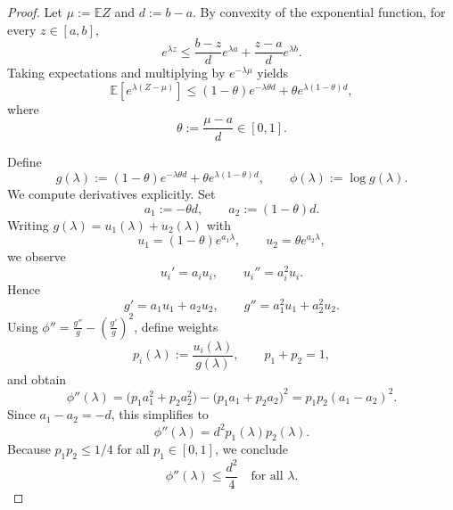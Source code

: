 \documentclass[12pt]{article}
\renewcommand{\(}{\left(}%
\renewcommand{\)}{\right)}%
\renewcommand{\[}{\left[}%
\renewcommand{\]}{\right]}%
\newtheorem{proof}{Proof.}}
\begin{document}
\begin{proof}
Let $\mu := \mathbb{E}Z$ and $d := b-a$. By convexity of the exponential function, for every $z \in [a,b]$,
\begin{equation*}
e^{\lambda z}
\le
\frac{b-z}{d} e^{\lambda a}
+
\frac{z-a}{d} e^{\lambda b}.
\end{equation*}
Taking expectations and multiplying by $e^{-\lambda\mu}$ yields
\begin{equation*}
\mathbb{E}\!\left[e^{\lambda(Z-\mu)}\right]
\le
(1-\theta)e^{-\lambda \theta d}
+
\theta e^{\lambda (1-\theta)d},
\end{equation*}
where
\begin{equation*}
\theta := \frac{\mu-a}{d} \in [0,1].
\end{equation*}

Define
\begin{equation*}
g(\lambda)
:=
(1-\theta)e^{-\lambda \theta d}
+
\theta e^{\lambda (1-\theta)d},
\qquad
\phi(\lambda)
:=
\log g(\lambda).
\end{equation*}
We compute derivatives explicitly. Set
\begin{equation*}
a_1 := -\theta d,
\qquad
a_2 := (1-\theta)d.
\end{equation*}
Writing $g(\lambda)=u_1(\lambda)+u_2(\lambda)$ with
\begin{equation*}
u_1=(1-\theta)e^{a_1\lambda},
\qquad
u_2=\theta e^{a_2\lambda},
\end{equation*}
we observe
\begin{equation*}
u_i' = a_i u_i,
\qquad
u_i'' = a_i^2 u_i.
\end{equation*}
Hence
\begin{equation*}
g' = a_1 u_1 + a_2 u_2,
\qquad
g'' = a_1^2 u_1 + a_2^2 u_2.
\end{equation*}
Using $\phi'' = \frac{g''}{g} - \left(\frac{g'}{g}\right)^2$, define weights
\begin{equation*}
p_i(\lambda) := \frac{u_i(\lambda)}{g(\lambda)},
\qquad
p_1+p_2=1,
\end{equation*}
and obtain
\begin{equation*}
\phi''(\lambda)
=
\big(p_1 a_1^2 + p_2 a_2^2\big)
-
\big(p_1 a_1 + p_2 a_2\big)^2
=
p_1 p_2 (a_1-a_2)^2.
\end{equation*}
Since $a_1-a_2=-d$, this simplifies to
\begin{equation*}
\phi''(\lambda)
=
d^2 p_1(\lambda)p_2(\lambda).
\end{equation*}
Because $p_1p_2 \le 1/4$ for all $p_1 \in [0,1]$, we conclude
\begin{equation*}
\phi''(\lambda)
\le
\frac{d^2}{4}
\quad \text{for all } \lambda.
\end{equation*}


\end{proof}
\end{document}
